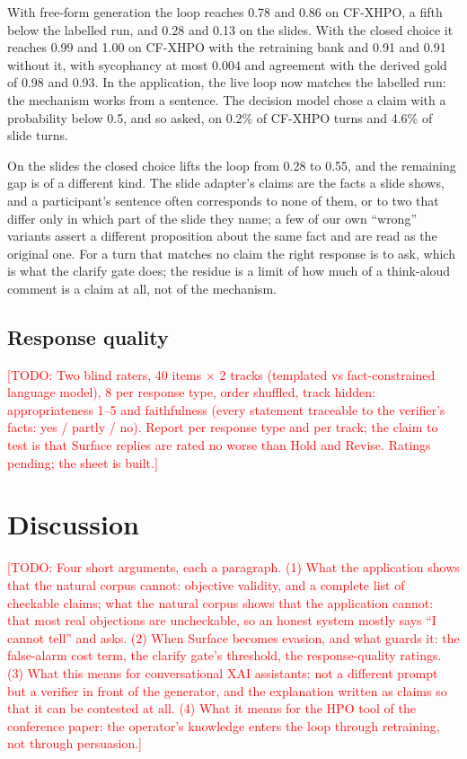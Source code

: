 \documentclass[preprint,12pt,3p,times]{elsarticle}
\newcommand{\todo}[1]{\textcolor{red}{[TODO: #1]}}
\begin{document}
With free-form generation the loop reaches 0.78 and 0.86 on CF-XHPO, a fifth below the labelled run, and 0.28 and 0.13 on the slides. With the closed choice it reaches 0.99 and 1.00 on CF-XHPO with the retraining bank and 0.91 and 0.91 without it, with sycophancy at most 0.004 and agreement with the derived gold of 0.98 and 0.93. In the application, the live loop now matches the labelled run: the mechanism works from a sentence. The decision model chose a claim with a probability below 0.5, and so asked, on 0.2\% of CF-XHPO turns and 4.6\% of slide turns.

On the slides the closed choice lifts the loop from 0.28 to 0.55, and the remaining gap is of a different kind. The slide adapter's claims are the facts a slide shows, and a participant's sentence often corresponds to none of them, or to two that differ only in which part of the slide they name; a few of our own ``wrong'' variants assert a different proposition about the same fact and are read as the original one. For a turn that matches no claim the right response is to ask, which is what the clarify gate does; the residue is a limit of how much of a think-aloud comment is a claim at all, not of the mechanism.

\subsection{Response quality}
\label{sec:res-quality}

\todo{Two blind raters, 40 items $\times$ 2 tracks (templated vs fact-constrained language model), 8 per response type, order shuffled, track hidden: appropriateness 1--5 and faithfulness (every statement traceable to the verifier's facts: yes / partly / no). Report per response type and per track; the claim to test is that Surface replies are rated no worse than Hold and Revise. Ratings pending; the sheet is built.}

\section{Discussion}
\todo{Four short arguments, each a paragraph. (1) What the application shows that the natural corpus cannot: objective validity, and a complete list of checkable claims; what the natural corpus shows that the application cannot: that most real objections are uncheckable, so an honest system mostly says ``I cannot tell'' and asks. (2) When Surface becomes evasion, and what guards it: the false-alarm cost term, the clarify gate's threshold, the response-quality ratings. (3) What this means for conversational XAI assistants: not a different prompt but a verifier in front of the generator, and the explanation written as claims so that it can be contested at all. (4) What it means for the HPO tool of the conference paper: the operator's knowledge enters the loop through retraining, not through persuasion.}
\end{document}

